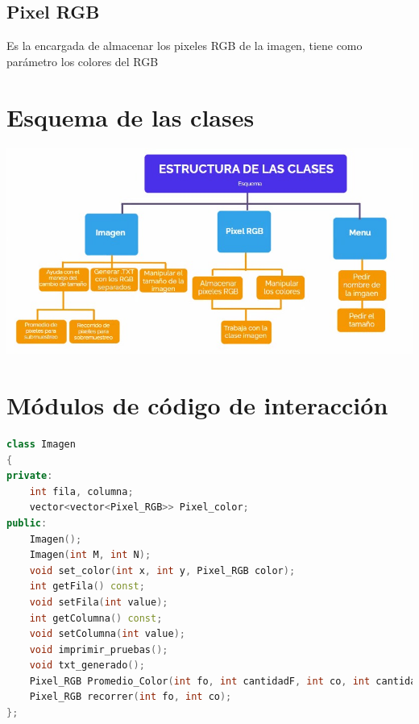 \documentclass{article}
\begin{document}
\subsection{Pixel RGB}
Es la encargada de almacenar los pixeles RGB de la imagen, tiene como parámetro los colores del RGB\\

\section{Esquema de las clases}
\includegraphics[width=14cm]{Imagenes/clases.jpeg}

\section{Módulos de código de interacción}

\begin{lstlisting}[language=C++, caption=Parámetros de la clase imagen]
class Imagen
{
private:
    int fila, columna;
    vector<vector<Pixel_RGB>> Pixel_color;
public:
    Imagen();
    Imagen(int M, int N);
    void set_color(int x, int y, Pixel_RGB color);  
    int getFila() const;
    void setFila(int value);
    int getColumna() const;
    void setColumna(int value);
    void imprimir_pruebas();
    void txt_generado();
    Pixel_RGB Promedio_Color(int fo, int cantidadF, int co, int cantidadC);
    Pixel_RGB recorrer(int fo, int co);
};
\end{lstlisting}
\end{document}
